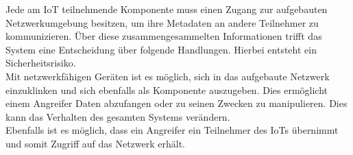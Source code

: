 Jede am \ac{IoT} teilnehmende Komponente muss einen Zugang zur aufgebauten Netzwerkumgebung besitzen, um ihre Metadaten an andere Teilnehmer zu kommunizieren. Über diese zusammengesammelten Informationen trifft das System eine Entscheidung über folgende Handlungen. Hierbei entsteht ein Sicherheitsrisiko.\\
Mit netzwerkfähigen Geräten ist es möglich, sich in das aufgebaute Netzwerk einzuklinken und sich ebenfalls als Komponente auszugeben. Dies ermöglicht einem Angreifer Daten abzufangen oder zu seinen Zwecken zu manipulieren. Dies kann das Verhalten des gesamten Systems verändern.\\
Ebenfalls ist es möglich, dass ein Angreifer ein Teilnehmer des \ac{IoT}s übernimmt und somit Zugriff auf das Netzwerk erhält.\\








